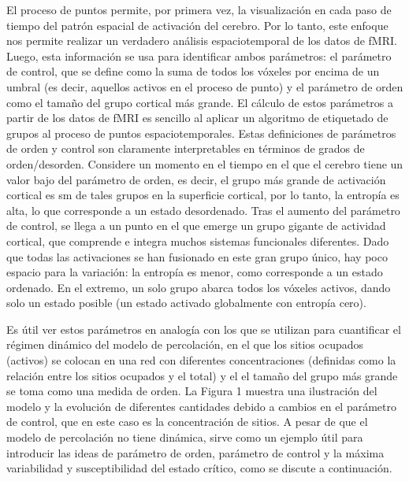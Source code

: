El proceso de puntos permite, por primera vez, la visualización en cada paso de tiempo del patrón espacial de activación del cerebro. Por lo tanto, este enfoque nos permite realizar un verdadero análisis espaciotemporal de los datos de fMRI. Luego, esta información se usa para identificar ambos parámetros: el parámetro de control, que se define como la suma de todos los vóxeles por encima de un umbral (es decir, aquellos activos en el proceso de punto) y el parámetro de orden como el tamaño del grupo cortical más grande. El cálculo de estos parámetros a partir de los datos de fMRI es sencillo al aplicar un algoritmo de etiquetado de grupos al proceso de puntos espaciotemporales. Estas definiciones de parámetros de orden y control son claramente interpretables en términos de grados de orden/desorden. Considere un momento en el tiempo en el que el cerebro tiene un valor bajo del parámetro de orden, es decir, el grupo más grande de activación cortical es sm de tales grupos en la superficie cortical, por lo tanto, la entropía es alta, lo que corresponde a un estado desordenado. Tras el aumento del parámetro de control, se llega a un punto en el que emerge un grupo gigante de actividad cortical, que comprende e integra muchos sistemas funcionales diferentes. Dado que todas las activaciones se han fusionado en este gran grupo único, hay poco espacio para la variación: la entropía es menor, como corresponde a un estado ordenado. En el extremo, un solo grupo abarca todos los vóxeles activos, dando solo un estado posible (un estado activado globalmente con entropía cero).


Es útil ver estos parámetros en analogía con los que se utilizan para cuantificar el régimen dinámico del modelo de percolación, en el que los sitios ocupados (activos) se colocan en una red con diferentes concentraciones (definidas como la relación entre los sitios ocupados y el total) y el el tamaño del grupo más grande se toma como una medida de orden. La Figura 1 muestra una ilustración del modelo y la evolución de diferentes cantidades debido a cambios en el parámetro de control, que en este caso es la concentración de sitios. A pesar de que el modelo de percolación no tiene dinámica, sirve como un ejemplo útil para introducir las ideas de parámetro de orden, parámetro de control y la máxima variabilidad y susceptibilidad del estado crítico, como se discute a continuación.

